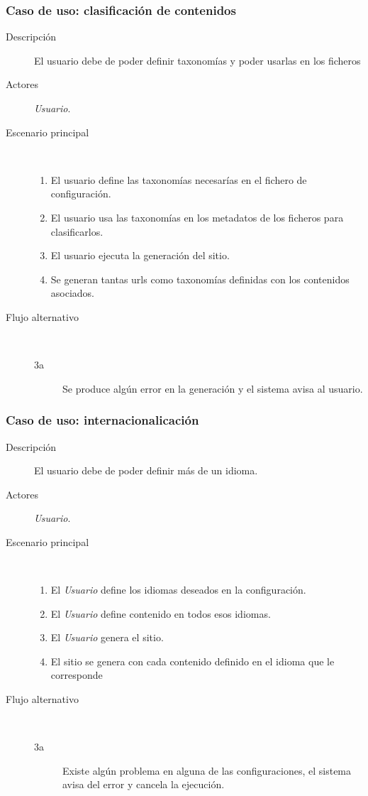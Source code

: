 \subsubsection{Caso de uso: clasificación de contenidos}

\begin{description}
    \item[Descripción] El usuario debe de poder definir taxonomías y poder usarlas en los ficheros
    \item[Actores] \textit{Usuario}.
    \item[Escenario principal] $\quad$
        \begin{enumerate}
            \item El usuario define las taxonomías necesarías en el fichero de configuración.
            \item El usuario usa las taxonomías en los metadatos de los ficheros para clasificarlos.
            \item El usuario ejecuta la generación del sitio.
            \item Se generan tantas urls como taxonomías definidas con los contenidos asociados.
        \end{enumerate}
    \item[Flujo alternativo] $\quad$
        \begin{description}
            \item[3a] Se produce algún error en la generación y el sistema avisa al usuario.
        \end{description}
\end{description}

\subsubsection{Caso de uso: internacionalicación}

\begin{description}
    \item[Descripción] El usuario debe de poder definir más de un idioma.
    \item[Actores] \textit{Usuario}.
    \item[Escenario principal] $\quad$
        \begin{enumerate}
            \item El \textit{Usuario} define los idiomas deseados en la configuración.
            \item El \textit{Usuario} define contenido en todos esos idiomas.
            \item El \textit{Usuario} genera el sitio.
            \item El sitio se genera con cada contenido definido en el idioma que le corresponde
        \end{enumerate}
    \item[Flujo alternativo] $\quad$
        \begin{description}
            \item[3a] Existe algún problema en alguna de las configuraciones, el sistema avisa del error
                y cancela la ejecución.
        \end{description}
\end{description}

